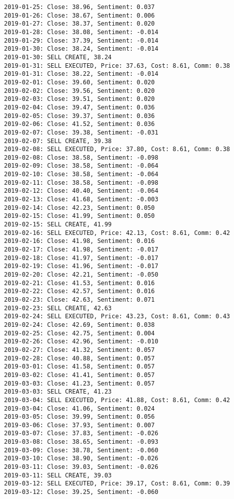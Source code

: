\documentclass[11pt]{article}
\begin{document}
\begin{Verbatim}[commandchars=\\\{\}]
2019-01-25: Close: 38.96, Sentiment: 0.037
2019-01-26: Close: 38.67, Sentiment: 0.006
2019-01-27: Close: 38.37, Sentiment: 0.020
2019-01-28: Close: 38.08, Sentiment: -0.014
2019-01-29: Close: 37.39, Sentiment: -0.014
2019-01-30: Close: 38.24, Sentiment: -0.014
2019-01-30: SELL CREATE, 38.24
2019-01-31: SELL EXECUTED, Price: 37.63, Cost: 8.61, Comm: 0.38
2019-01-31: Close: 38.22, Sentiment: -0.014
2019-02-01: Close: 39.60, Sentiment: 0.020
2019-02-02: Close: 39.56, Sentiment: 0.020
2019-02-03: Close: 39.51, Sentiment: 0.020
2019-02-04: Close: 39.47, Sentiment: 0.036
2019-02-05: Close: 39.37, Sentiment: 0.036
2019-02-06: Close: 41.52, Sentiment: 0.036
2019-02-07: Close: 39.38, Sentiment: -0.031
2019-02-07: SELL CREATE, 39.38
2019-02-08: SELL EXECUTED, Price: 37.80, Cost: 8.61, Comm: 0.38
2019-02-08: Close: 38.58, Sentiment: -0.098
2019-02-09: Close: 38.58, Sentiment: -0.064
2019-02-10: Close: 38.58, Sentiment: -0.064
2019-02-11: Close: 38.58, Sentiment: -0.098
2019-02-12: Close: 40.40, Sentiment: -0.064
2019-02-13: Close: 41.68, Sentiment: -0.003
2019-02-14: Close: 42.23, Sentiment: 0.050
2019-02-15: Close: 41.99, Sentiment: 0.050
2019-02-15: SELL CREATE, 41.99
2019-02-16: SELL EXECUTED, Price: 42.13, Cost: 8.61, Comm: 0.42
2019-02-16: Close: 41.98, Sentiment: 0.016
2019-02-17: Close: 41.98, Sentiment: -0.017
2019-02-18: Close: 41.97, Sentiment: -0.017
2019-02-19: Close: 41.96, Sentiment: -0.017
2019-02-20: Close: 42.21, Sentiment: -0.050
2019-02-21: Close: 41.53, Sentiment: 0.016
2019-02-22: Close: 42.57, Sentiment: 0.016
2019-02-23: Close: 42.63, Sentiment: 0.071
2019-02-23: SELL CREATE, 42.63
2019-02-24: SELL EXECUTED, Price: 43.23, Cost: 8.61, Comm: 0.43
2019-02-24: Close: 42.69, Sentiment: 0.038
2019-02-25: Close: 42.75, Sentiment: 0.004
2019-02-26: Close: 42.96, Sentiment: -0.010
2019-02-27: Close: 41.32, Sentiment: 0.057
2019-02-28: Close: 40.88, Sentiment: 0.057
2019-03-01: Close: 41.58, Sentiment: 0.057
2019-03-02: Close: 41.41, Sentiment: 0.057
2019-03-03: Close: 41.23, Sentiment: 0.057
2019-03-03: SELL CREATE, 41.23
2019-03-04: SELL EXECUTED, Price: 41.88, Cost: 8.61, Comm: 0.42
2019-03-04: Close: 41.06, Sentiment: 0.024
2019-03-05: Close: 39.99, Sentiment: 0.056
2019-03-06: Close: 37.93, Sentiment: 0.007
2019-03-07: Close: 37.83, Sentiment: -0.026
2019-03-08: Close: 38.65, Sentiment: -0.093
2019-03-09: Close: 38.78, Sentiment: -0.060
2019-03-10: Close: 38.90, Sentiment: -0.026
2019-03-11: Close: 39.03, Sentiment: -0.026
2019-03-11: SELL CREATE, 39.03
2019-03-12: SELL EXECUTED, Price: 39.17, Cost: 8.61, Comm: 0.39
2019-03-12: Close: 39.25, Sentiment: -0.060

\end{Verbatim}
\end{document}
